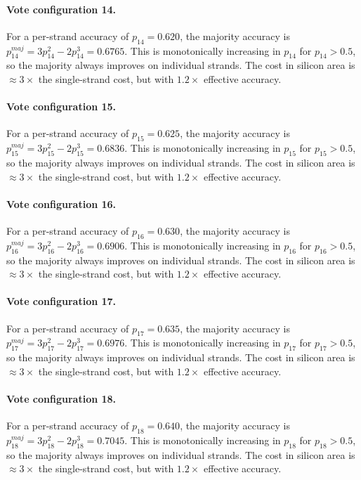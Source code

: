\paragraph{Vote configuration 14.}
For a per-strand accuracy of $p_{14} = 0.620$, the majority
accuracy is $p_{14}^{maj} = 3p_{14}^2 - 2p_{14}^3 = 0.6765$.
This is monotonically increasing in $p_{14}$ for $p_{14} > 0.5$, so the
majority always improves on individual strands. The cost in silicon area is
$\approx 3\times$ the single-strand cost, but with $1.2\times$ effective accuracy.

\paragraph{Vote configuration 15.}
For a per-strand accuracy of $p_{15} = 0.625$, the majority
accuracy is $p_{15}^{maj} = 3p_{15}^2 - 2p_{15}^3 = 0.6836$.
This is monotonically increasing in $p_{15}$ for $p_{15} > 0.5$, so the
majority always improves on individual strands. The cost in silicon area is
$\approx 3\times$ the single-strand cost, but with $1.2\times$ effective accuracy.

\paragraph{Vote configuration 16.}
For a per-strand accuracy of $p_{16} = 0.630$, the majority
accuracy is $p_{16}^{maj} = 3p_{16}^2 - 2p_{16}^3 = 0.6906$.
This is monotonically increasing in $p_{16}$ for $p_{16} > 0.5$, so the
majority always improves on individual strands. The cost in silicon area is
$\approx 3\times$ the single-strand cost, but with $1.2\times$ effective accuracy.

\paragraph{Vote configuration 17.}
For a per-strand accuracy of $p_{17} = 0.635$, the majority
accuracy is $p_{17}^{maj} = 3p_{17}^2 - 2p_{17}^3 = 0.6976$.
This is monotonically increasing in $p_{17}$ for $p_{17} > 0.5$, so the
majority always improves on individual strands. The cost in silicon area is
$\approx 3\times$ the single-strand cost, but with $1.2\times$ effective accuracy.

\paragraph{Vote configuration 18.}
For a per-strand accuracy of $p_{18} = 0.640$, the majority
accuracy is $p_{18}^{maj} = 3p_{18}^2 - 2p_{18}^3 = 0.7045$.
This is monotonically increasing in $p_{18}$ for $p_{18} > 0.5$, so the
majority always improves on individual strands. The cost in silicon area is
$\approx 3\times$ the single-strand cost, but with $1.2\times$ effective accuracy.

